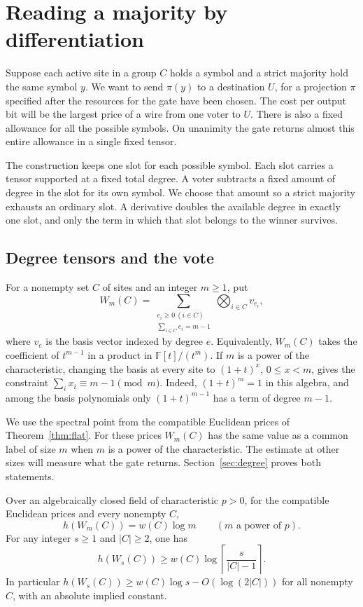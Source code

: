 \section{Reading a majority by differentiation}\label{sec:vote}

Suppose each active site in a group \(C\) holds a symbol and a strict
majority hold the same symbol \(y\). We want to send \(\pi(y)\) to a
destination \(U\), for a projection \(\pi\) specified after the
resources for the gate have been chosen. The cost per output bit will
be the largest price of a wire from one voter to \(U\). There is also
a fixed allowance for all the possible symbols. On unanimity the
gate returns almost this entire allowance in a single fixed tensor.

The construction keeps one slot for each possible symbol. Each slot
carries a tensor supported at a fixed total degree. A voter subtracts
a fixed amount of degree in the slot for its own symbol. We choose
that amount so a strict majority exhausts an ordinary slot. A
derivative doubles the available degree in exactly one slot, and only
the term in which that slot belongs to the winner survives.

\subsection{Degree tensors and the vote}

For a nonempty set \(C\) of sites and an integer \(m\ge1\), put
\[
 W_m(C)=
 \sum_{\substack{e_i\ge0\ (i\in C)\\ \sum_{i\in C}e_i=m-1}}
         \bigotimes_{i\in C}v_{e_i},
\]
where \(v_e\) is the basis vector indexed by degree \(e\).
Equivalently, \(W_m(C)\) takes the coefficient of \(t^{m-1}\) in a
product in \(\mathbb F[t]/(t^m)\). If \(m\) is a power of the
characteristic, changing the basis at every site to
\((1+t)^x\), \(0\le x<m\), gives the constraint
\(\sum_i x_i\equiv m-1\pmod m\). Indeed, \((1+t)^m=1\) in this
algebra, and among the basis polynomials only \((1+t)^{m-1}\) has a
term of degree \(m-1\).

We use the spectral point from the compatible Euclidean prices of
Theorem~\ref{thm:flat}. For these prices \(W_m(C)\) has the same value
as a common label of size \(m\) when \(m\) is a power of the
characteristic. The estimate at other sizes will measure what the gate
returns. Section~\ref{sec:degree} proves both statements.

\begin{lemma}\label{lem:degree-width}
Over an algebraically closed field of characteristic \(p>0\), for the
compatible Euclidean prices and every nonempty \(C\),
\[
              h(W_m(C))=w(C)\log m
              \qquad(m\text{ a power of }p).
\]
For any integer \(s\ge1\) and \(|C|\ge2\), one has
\[
              h(W_s(C))\ge
              w(C)\log\left\lceil\frac{s}{|C|-1}\right\rceil .
\]
In particular \(h(W_s(C))\ge w(C)\log s-O(\log(2|C|))\) for all
nonempty \(C\), with an absolute implied constant.
\end{lemma}

